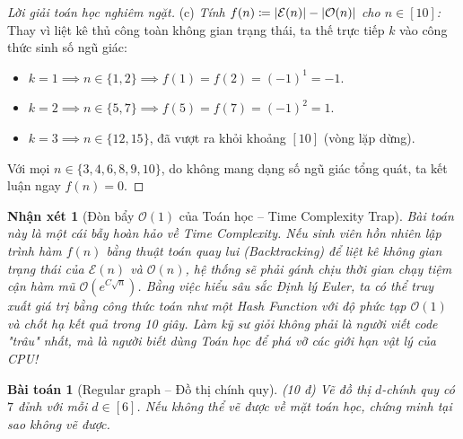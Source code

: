 \documentclass{article}
\newtheorem{baitoan}{Bài toán}
\newtheorem{nhanxet}{Nhận xét}
\begin{document}
\begin{proof}[Lời giải toán học nghiêm ngặt]
	\item(c) \textit{Tính $f(n) \coloneqq |{\cal E}(n)| - |{\cal O}(n)|$ cho $n \in [10]$:}\\
	Thay vì liệt kê thủ công toàn không gian trạng thái, ta thế trực tiếp $k$ vào công thức sinh số ngũ giác:
	\begin{itemize}
		\item $k=1 \implies n \in \{1, 2\} \implies f(1) = f(2) = (-1)^1 = -1$.
		\item $k=2 \implies n \in \{5, 7\} \implies f(5) = f(7) = (-1)^2 = 1$.
		\item $k=3 \implies n \in \{12, 15\}$, đã vượt ra khỏi khoảng $[10]$ (vòng lặp dừng).
	\end{itemize}
	Với mọi $n \in \{3,4,6,8,9,10\}$, do không mang dạng số ngũ giác tổng quát, ta kết luận ngay $f(n) = 0$.
\end{proof}

\begin{nhanxet}[Đòn bẩy $\mathcal{O}(1)$ của Toán học -- Time Complexity Trap]
	Bài toán này là một cái bẫy hoàn hảo về \textsf{Time Complexity}. Nếu sinh viên hồn nhiên lập trình hàm $f(n)$ bằng thuật toán quay lui (Backtracking) để liệt kê không gian trạng thái của $\mathcal{E}(n)$ và $\mathcal{O}(n)$, hệ thống sẽ phải gánh chịu thời gian chạy tiệm cận hàm mũ $\mathcal{O}(e^{C\sqrt{n}})$. Bằng việc hiểu sâu sắc Định lý Euler, ta có thể truy xuất giá trị bằng công thức toán như một \emph{Hash Function} với độ phức tạp $\mathcal{O}(1)$ và chốt hạ kết quả trong 10 giây. Làm kỹ sư giỏi không phải là người viết code "trâu" nhất, mà là người biết dùng Toán học để phá vỡ các giới hạn vật lý của CPU!
\end{nhanxet}

\begin{baitoan}[Regular graph -- Đồ thị chính quy]
	\emph{(10 đ)} Vẽ đồ thị $d$-chính quy có $7$ đỉnh với mỗi $d\in[6]$. Nếu không thể vẽ được về mặt toán học, chứng minh tại sao không vẽ được.
\end{baitoan}
\end{document}
